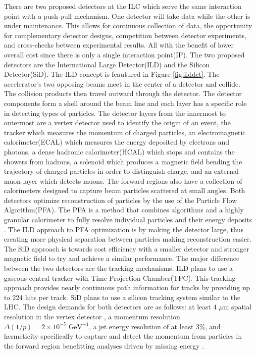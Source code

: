 There are two proposed detectors at the ILC which serve the same interaction point with a push-pull mechanism. One detector will take data while the other is under maintenance. This allows for continuous collection of data, the opportunity for complementary detector designs, competition between detector experiments, and cross-checks between experimental results. All with the benefit of lower overall cost since there is only a single interaction point(IP). The two proposed detectors are the International Large Detector(ILD) and the Silicon Detector(SiD). The ILD concept is feautured in Figure \ref{fig:ilddet}. The accelerator's two opposing beams meet in the center of a detector and collide. The collision products then travel outward through the detector.  The detector components form a shell around the beam line and each layer has a specific role in detecting types of particles. The detector layers from the innermost to outermost are a vertex detector used to identify the origin of an event, the tracker  which measures the momentum of charged particles, an electromagnetic calorimeter(ECAL) which measures the energy deposited by electrons and photons, a dense hadronic calorimeter(HCAL) which stops and contains the showers from hadrons,  a solenoid which produces a magnetic field bending the trajectory of charged particles in order to distinguish charge, and an external muon layer which detects muons. The forward regions also have a collection of calorimeters designed to capture beam particles scattered at small angles. Both detectors optimize reconstruction of particles by the use of the Particle Flow Algorithm(PFA). The PFA is a method that combines algorithms and a highly granular calorimeter to fully resolve individual particles and their energy deposits \cite{pfa}.
The ILD approach to PFA optimization is by making the detector large, thus creating more physical separation between particles making reconstruction easier. The SiD approach is towards cost efficiency with a smaller detector and stronger magnetic field to try and achieve a similar performance. 
The major difference between the two detectors are the tracking mechanisms.   ILD plans to use a gaseous central tracker with Time Projection Chamber(TPC). This tracking approach provides nearly continuous path information for tracks by providing up to 224 hits per track. SiD plans to use a silicon tracking system similar to the LHC. The design demands for both detectors are as follows: at least $4 \, \, \mu$m spatial resolution in the vertex detector , a momentum resolution $\Delta (1/p) =  2 \times  10^{-5} \, \, \text{GeV}^{-1}$, a jet energy resolution of at least $3\%$, and hermeticity specifically to capture and detect the momentum from particles in the forward region benefitting analyses driven by missing energy \cite{currdetector}.

